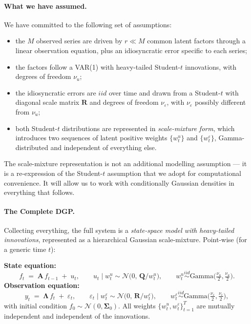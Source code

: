 \documentclass[11pt, a4paper, oneside]{article}
\newcommand{\mL}{\boldsymbol{\Lambda}}
\newcommand{\mA}{\mathbf{A}}
\newcommand{\mR}{\mathbf{R}}
\newcommand{\mQ}{\mathbf{Q}}
\begin{document}
\paragraph{What we have assumed.}
We have committed to the following set of assumptions:
\begin{itemize}[leftmargin=1.5em, itemsep=3pt]
    \item the $M$ observed series are driven by $r \ll M$ common latent
          factors through a linear observation equation, plus an
          idiosyncratic error specific to each series;
    \item the factors follow a VAR(1) with heavy-tailed Student-$t$
          innovations, with degrees of freedom $\nu_u$;
    \item the idiosyncratic errors are $iid$ over time and drawn from a
          Student-$t$ with diagonal scale matrix $\mR$ and degrees of
          freedom $\nu_\varepsilon$, with $\nu_\varepsilon$ possibly
          different from $\nu_u$;
    \item both Student-$t$ distributions are represented in
          \emph{scale-mixture form}, which introduces two sequences of
          latent positive weights $\{w^u_t\}$ and $\{w^\varepsilon_t\}$,
          Gamma-distributed and independent of everything else.
\end{itemize}
The scale-mixture representation is not an additional modelling
assumption — it is a re-expression of the Student-$t$ assumption that we
adopt for computational convenience. It will allow us to work with
conditionally Gaussian densities in everything that follows.

\paragraph{The Complete DGP.}
Collecting everything, the full system is a \emph{state-space model with
heavy-tailed innovations}, represented as a hierarchical Gaussian
scale-mixture. Point-wise (for a generic time $t$):

\medskip
\noindent\textbf{State equation:}
\begin{equation}
f_t \;=\; \mA\, f_{t-1} \;+\; u_t,
\qquad
u_t \mid w^u_t \sim \mathcal{N}\!\big(0,\, \mQ / w^u_t\big),
\qquad
w^u_t \overset{iid}{\sim} \text{Gamma}\!\big(\tfrac{\nu_u}{2},\tfrac{\nu_u}{2}\big).
\label{eq:dgp-state}
\end{equation}
\noindent\textbf{Observation equation:}
\begin{equation}
y_t \;=\; \mL\, f_t \;+\; \varepsilon_t,
\qquad
\varepsilon_t \mid w^\varepsilon_t \sim \mathcal{N}\!\big(0,\, \mR / w^\varepsilon_t\big),
\qquad
w^\varepsilon_t \overset{iid}{\sim} \text{Gamma}\!\big(\tfrac{\nu_\varepsilon}{2},\tfrac{\nu_\varepsilon}{2}\big),
\label{eq:dgp-obs}
\end{equation}
with initial condition $f_0 \sim \mathcal{N}(0, \boldsymbol{\Sigma}_0)$. All
weights $\{w^u_t, w^\varepsilon_t\}_{t=1}^{T}$ are mutually independent
and independent of the innovations.
\end{document}
